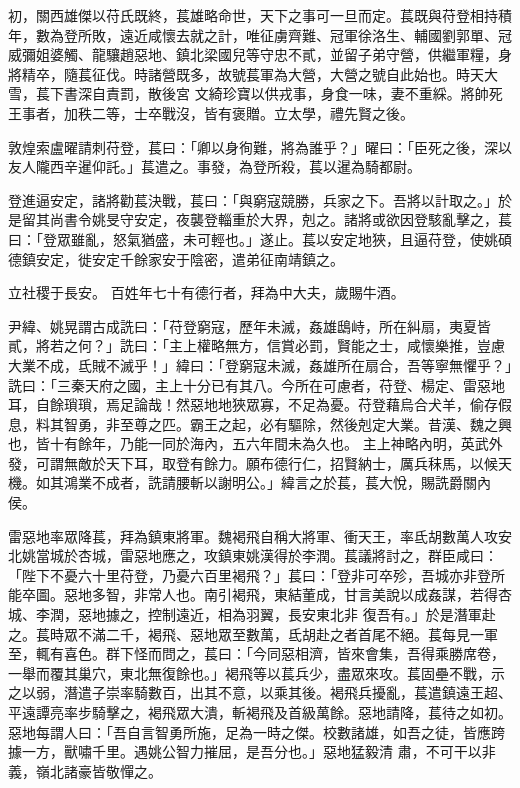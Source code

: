 \begin{pinyinscope}
 初，關西雄傑以苻氏既終，萇雄略命世，天下之事可一旦而定。萇既與苻登相持積年，數為登所敗，遠近咸懷去就之計，唯征虜齊難、冠軍徐洛生、輔國劉郭單、冠威彌姐婆觸、龍驤趙惡地、鎮北梁國兒等守忠不貳，並留子弟守營，供繼軍糧，身將精卒，隨萇征伐。時諸營既多，故號萇軍為大營，大營之號自此始也。時天大雪，萇下書深自責罰，散後宮
 文綺珍寶以供戎事，身食一味，妻不重綵。將帥死王事者，加秩二等，士卒戰沒，皆有褒贈。立太學，禮先賢之後。



 敦煌索盧曜請刺苻登，萇曰：「卿以身徇難，將為誰乎？」曜曰：「臣死之後，深以友人隴西辛暹仰託。」萇遣之。事發，為登所殺，萇以暹為騎都尉。



 登進逼安定，諸將勸萇決戰，萇曰：「與窮寇競勝，兵家之下。吾將以計取之。」於是留其尚書令姚旻守安定，夜襲登輜重於大界，剋之。諸將或欲因登駭亂擊之，萇曰：「登眾雖亂，怒氣猶盛，未可輕也。」遂止。萇以安定地狹，且逼苻登，使姚碩德鎮安定，徙安定千餘家安于陰密，遣弟征南靖鎮之。



 立社稷于長安。
 百姓年七十有德行者，拜為中大夫，歲賜牛酒。



 尹緯、姚晃謂古成詵曰：「苻登窮寇，歷年未滅，姦雄鴟峙，所在糾扇，夷夏皆貳，將若之何？」詵曰：「主上權略無方，信賞必罰，賢能之士，咸懷樂推，豈慮大業不成，氐賊不滅乎！」緯曰：「登窮寇未滅，姦雄所在扇合，吾等寧無懼乎？」詵曰：「三秦天府之國，主上十分已有其八。今所在可慮者，苻登、楊定、雷惡地耳，自餘瑣瑣，焉足論哉！然惡地地狹眾寡，不足為憂。苻登藉烏合犬羊，偷存假息，料其智勇，非至尊之匹。霸王之起，必有驅除，然後剋定大業。昔漢、魏之興也，皆十有餘年，乃能一同於海內，五六年間未為久也。
 主上神略內明，英武外發，可謂無敵於天下耳，取登有餘力。願布德行仁，招賢納士，厲兵秣馬，以候天機。如其鴻業不成者，詵請腰斬以謝明公。」緯言之於萇，萇大悅，賜詵爵關內侯。



 雷惡地率眾降萇，拜為鎮東將軍。魏褐飛自稱大將軍、衝天王，率氐胡數萬人攻安北姚當城於杏城，雷惡地應之，攻鎮東姚漢得於李潤。萇議將討之，群臣咸曰：「陛下不憂六十里苻登，乃憂六百里褐飛？」萇曰：「登非可卒殄，吾城亦非登所能卒圖。惡地多智，非常人也。南引褐飛，東結董成，甘言美說以成姦謀，若得杏城、李潤，惡地據之，控制遠近，相為羽翼，長安東北非
 復吾有。」於是潛軍赴之。萇時眾不滿二千，褐飛、惡地眾至數萬，氐胡赴之者首尾不絕。萇每見一軍至，輒有喜色。群下怪而問之，萇曰：「今同惡相濟，皆來會集，吾得乘勝席卷，一舉而覆其巢穴，東北無復餘也。」褐飛等以萇兵少，盡眾來攻。萇固壘不戰，示之以弱，潛遣子崇率騎數百，出其不意，以乘其後。褐飛兵擾亂，萇遣鎮遠王超、平遠譚亮率步騎擊之，褐飛眾大潰，斬褐飛及首級萬餘。惡地請降，萇待之如初。惡地每謂人曰：「吾自言智勇所施，足為一時之傑。校數諸雄，如吾之徒，皆應跨據一方，獸嘯千里。遇姚公智力摧屈，是吾分也。」惡地猛毅清
 肅，不可干以非義，嶺北諸豪皆敬憚之。




\end{pinyinscope}
